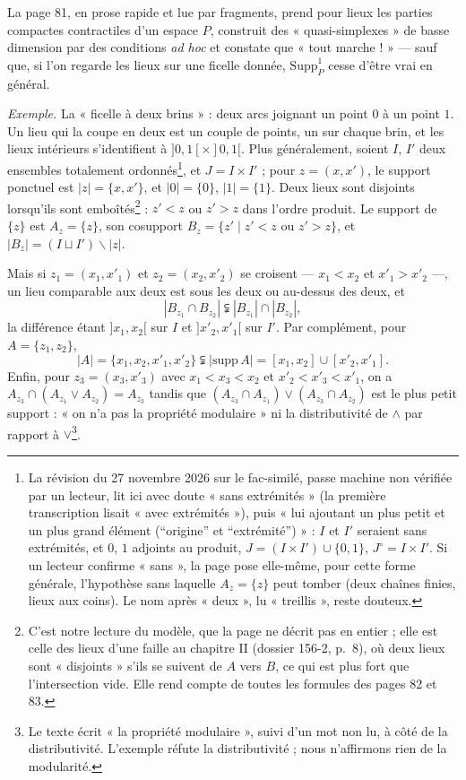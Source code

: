 \documentclass[11pt,a4paper]{article}
\begin{document}
La page 81, en prose rapide et lue par fragments, prend pour lieux les parties
compactes contractiles d'un espace $P$, construit des « quasi-simplexes » de
basse dimension par des conditions \emph{ad hoc} et constate que « tout marche ! »
--- sauf que, si l'on regarde les lieux sur une ficelle donnée,
$\mathrm{Supp}^{1}_{P}$ cesse d'être vrai en général.

\emph{Exemple.} La « ficelle à deux brins » : deux arcs joignant un point $0$ à
un point $1$. Un lieu qui la coupe en deux est un couple de points, un sur chaque
brin, et les lieux intérieurs s'identifient à $]0, 1[ \times ]0, 1[$. Plus
généralement, soient $I$, $I'$ deux ensembles totalement ordonnés\footnote{La
révision du 27 novembre 2026 sur le fac-similé, passe machine non vérifiée par un
lecteur, lit ici avec doute « sans extrémités » (la première transcription
lisait « avec extrémités »), puis « lui ajoutant un plus petit et un plus grand
élément (“origine” et “extrémité”) » : $I$ et $I'$ seraient sans extrémités, et
$0$, $1$ adjoints au produit, $J = (I \times I') \cup \{0, 1\}$, $J^{\circ} = I
\times I'$. Si un lecteur confirme « sans », la page pose elle-même, pour cette
forme générale, l'hypothèse sans laquelle $A_{z} = \{z\}$ peut tomber (deux
chaînes finies, lieux aux coins). Le nom après « deux », lu « treillis », reste
douteux.}, et $J = I
\times I'$ ; pour $z = (x, x')$, le support ponctuel est $|z| = \{x, x'\}$, et
$|0| = \{0\}$, $|1| = \{1\}$. Deux lieux sont disjoints lorsqu'ils sont
emboîtés\footnote{C'est notre lecture du modèle, que la page ne décrit pas en
entier ; elle est celle des lieux d'une faille au chapitre II (dossier 156-2,
p.~8), où deux lieux sont « disjoints » s'ils se suivent de $A$ vers $B$, ce qui
est plus fort que l'intersection vide. Elle rend compte de toutes les formules
des pages 82 et 83.} : $z' < z$ ou $z' > z$ dans l'ordre produit. Le support de
$\{z\}$ est $A_{z} = \{z\}$, son cosupport $B_{z} = \{z' \mid z' < z \text{ ou }
z' > z\}$, et $|B_{z}| = (I \sqcup I') \smallsetminus |z|$.

Mais si $z_{1} = (x_{1}, x'_{1})$ et $z_{2} = (x_{2}, x'_{2})$ se croisent ---
$x_{1} < x_{2}$ et $x'_{1} > x'_{2}$ ---, un lieu comparable aux deux est sous les
deux ou au-dessus des deux, et
\[
|B_{z_{1}} \cap B_{z_{2}}| \subsetneqq |B_{z_{1}}| \cap |B_{z_{2}}| ,
\]
la différence étant $]x_{1}, x_{2}[$ sur $I$ et $]x'_{2}, x'_{1}[$ sur $I'$. Par
complément, pour $A = \{z_{1}, z_{2}\}$,
\[
|A| = \{x_{1}, x_{2}, x'_{1}, x'_{2}\} \subsetneqq |\mathrm{supp}\, A| = [x_{1},
x_{2}] \cup [x'_{2}, x'_{1}] .
\]
Enfin, pour $z_{3} = (x_{3}, x'_{3})$ avec $x_{1} < x_{3} < x_{2}$ et $x'_{2} <
x'_{3} < x'_{1}$, on a $A_{z_{3}} \cap (A_{z_{1}} \vee A_{z_{2}}) = A_{z_{3}}$ tandis
que $(A_{z_{3}} \cap A_{z_{1}}) \vee (A_{z_{3}} \cap A_{z_{2}})$ est le plus petit
support : « on n'a pas la propriété modulaire » ni la distributivité de $\wedge$
par rapport à $\vee$\footnote{Le texte écrit « la propriété modulaire », suivi
d'un mot non lu, à côté de la distributivité. L'exemple réfute la distributivité ;
nous n'affirmons rien de la modularité.}.
\end{document}
